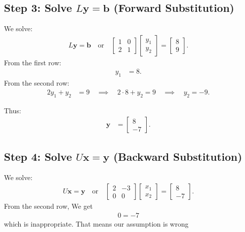 \documentclass[journal]{IEEEtran}
\begin{document}
	\subsection*{Step 3: Solve $L\mathbf{y} = \mathbf{b}$ (Forward Substitution)}
	We solve:
	\begin{align}
		L\mathbf{y} = \mathbf{b} \quad \text{or} \quad \begin{bmatrix} 1 & 0 \\ 2 & 1 \end{bmatrix} \begin{bmatrix} y_1 \\ y_2 \end{bmatrix} = \begin{bmatrix} 8 \\ 9 \end{bmatrix}.
	\end{align}
	From the first row:
	\begin{align}
		y_1 &= 8.
	\end{align}
	From the second row:
	\begin{align}
		2 y_1 + y_2 &= 9 \quad \implies \quad 2 \cdot 8 + y_2 = 9 \quad \implies \quad y_2 = -9.
	\end{align}
	
	Thus:
	\begin{align}
		\mathbf{y} &= \begin{bmatrix} 8 \\ -7 \end{bmatrix}.
	\end{align}
	
	\subsection*{Step 4: Solve $U\mathbf{x} = \mathbf{y}$ (Backward Substitution)}
	We solve:
	\begin{align}
		U\mathbf{x} = \mathbf{y} \quad \text{or} \quad \begin{bmatrix} 2 & -3 \\ 0 & 0 \end{bmatrix} \begin{bmatrix} x_1 \\ x_2 \end{bmatrix} = \begin{bmatrix} 8 \\ -7 \end{bmatrix}.
	\end{align}
	From the second row, We get
	\begin{align}
		0=-7
	\end{align}
    which is inappropriate. That means our assumption is wrong
	
\end{document}

